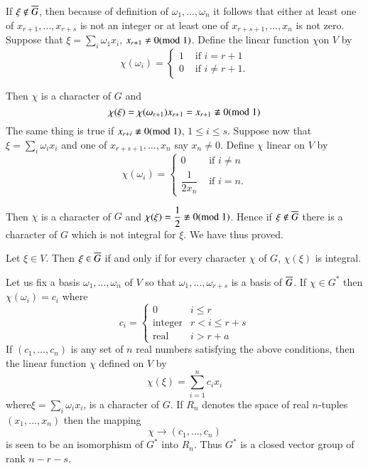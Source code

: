 If $\xi\not\in\overline{G}$, then because of definition of
$\omega_1,\ldots, \omega_n$ it follows that either at least one of
$x_{r+1},\ldots, x_{r+s}$ is not an integer or at least one of
$x_{r+s+1},\ldots, x_n$ is not zero. Suppose that $\xi =
\sum\limits_{i}\omega_1 x_i$, $x_{r+1}\neq 0(\rm{mod} \; 1)$. Define the
linear function $\chi$\pageoriginale on $V$ by
$$
\chi(\omega_i) =
\begin{cases}
1 & \text{ if } i = r+1\\
0 & \text{ if } i \neq r + 1.
\end{cases}
$$

Then $\chi$ is a character of $G$ and 
$$
\chi(\xi) = \chi (\omega_{r+1})x_{r+1} = x_{r+1} \not\equiv 0(\rm{mod} \;
1)
$$
The same thing is true if $x_{r+i}\not\equiv 0 (\rm{mod} \; 1)$, $1\leq i \leq
s$. Suppose now that $\xi=\sum\limits_i \omega_i x_i$ and one of
$x_{r+s+1},\ldots, x_n$ say $x_n\neq 0$. Define $\chi$ linear on $V$
by
$$
\chi(\omega_i)=
\begin{cases}
0 & \text{ if } i \neq n\\
\dfrac{1}{2x_n} & \text{ if } i = n.
\end{cases}
$$

Then $\chi$ is a character of $G$ and $\chi(\xi)=\dfrac{1}{2}\not\equiv
0(\rm{mod} \; 1)$. Hence if $\xi\not\in\overline{G}$ there is a character of $G$
which is not integral for $\xi$. We have thus proved.


\begin{thm}\label{chap1:thm4}
Let $\xi\in V$. Then $\xi \in\overline{G}$ if and only if for every
character $\chi$ of $G$, $\chi(\xi)$ is integral.
\end{thm}

Let us fix a basis $\omega_1,\ldots,\omega_n$ of $V$ so that
$\omega_1,\ldots,\omega_{r+s}$ is a basis of $\overline{G}$. If $\chi \in
G^{\ast}$ then $\chi(\omega_i)=c_i$ where 
$$
c_{i}=
\begin{cases}
0 & i\leq r\\
\text{integer} & r<i\leq r+s\\
\text{real} & i>r+a
\end{cases}
$$
If $(c_{1},\ldots,c_{n})$ is any set of $n$ real numbers satisfying
the above conditions, then the linear function $\chi$ defined on $V$
by
$$
\chi(\xi)=\sum^{n}_{i=1}c_{i}x_{i}
$$
where\pageoriginale $\xi=\sum\limits_{i}\omega_{i}x_{i}$, is a
character of $G$. If $R_{n}$ denotes the space of real $n$-tuples
$(x_{1},\ldots,x_{n})$ then the mapping
$$
\chi\to (c_{1},\ldots,c_{n})
$$
is seen to be an isomorphism of $G^{\ast}$ into $R_{n}$. Thus
$G^{\ast}$ is a closed vector group of rank $n-r-s$.

